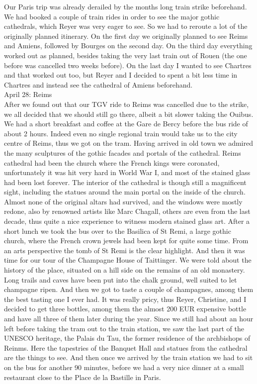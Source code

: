 Our Paris trip was already derailed by the months long train strike beforehand. We had booked a couple of train rides in order to see the major gothic cathedrals, which Reyer was very eager to see. So we had to reroute a lot of the originally planned itinerary. On the first day we originally planned to see Reims and Amiens, followed by Bourges on the second day. On the third day everything worked out as planned, besides taking the very last train out of Rouen (the one before was cancelled two weeks before). On the last day I wanted to see Chartres and that worked out too, but Reyer and I decided to spent a bit less time in Chartres and instead see the cathedral of Amiens beforehand.\\

April 28: Reims\\
After we found out that our TGV ride to Reims was cancelled due to the strike, we all decided that we should still go there, albeit a bit slower taking the Ouibus. We had a short breakfast and coffee at the Gare de Bercy before the bus ride of about 2 hours. Indeed even no single regional train would take us to the city centre of Reims, thus we got on the tram. Having arrived in old town we admired the many sculptures of the gothic facades and portals of the cathedral. Reims cathedral had been the church where the French kings were coronated, unfortunately it was hit very hard in World War I, and most of the stained glass had been lost forever. The interior of the cathedral is though still a magnificent sight, including the statues around the main portal on the inside of the church. Almost none of the original altars had survived, and the windows were mostly redone, also by renowned artists like Marc Chagall, others are even from the last decade, thus quite a nice experience to witness modern stained glass art. After a short lunch we took the bus over to the Basilica of St Remi, a large gothic church, where the French crown jewels had been kept for quite some time. From an arts perspective the tomb of St Remi is the clear highlight. And then it was time for our tour of the Champagne House of Taittinger. We were told about the history of the place, situated on a hill side on the remains of an old monastery. Long trails and caves have been put into the chalk ground, well suited to let champagne ripen. And then we got to taste a couple of champagnes, among them the best tasting one I ever had. It was really pricy, thus Reyer, Christine, and I decided to get three bottles, among them the almost 200 EUR expensive bottle and have all three of them later during the year. Since we still had about an hour left before taking the tram out to the train station, we saw the last part of the UNESCO heritage, the Palais du Tau, the former residence of the archbishops of Reinms. Here the tapestries of the Banquet Hall and statues from the cathedral are the things to see. And then once we arrived by the train station we had to sit on the bus for another 90 minutes, before we had a very nice dinner at a small restaurant close to the Place de la Bastille in Paris.\\

